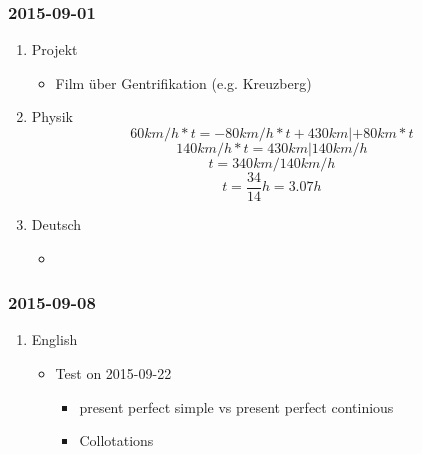 \documentclass[11pt]{article}
\begin{document}
\subsubsection{2015-09-01}
\label{sec-1-2-3}
\begin{enumerate}
\item Projekt
\label{sec-1-2-3-1}
\begin{itemize}
\item Film über Gentrifikation (e.g. Kreuzberg)
\end{itemize}
\item Physik
\label{sec-1-2-3-2}
\begin{equation}
60km/h * t = -80km/h * t + 430km | + 80km * t
\end{equation}
\begin{equation}
140km/h * t = 430km | 140km/h
\end{equation}
\begin{equation}
t = 340km/140km/h
\end{equation}
\begin{equation}
t = \frac{34}{14}h = 3.07h
\end{equation}
\item Deutsch
\label{sec-1-2-3-3}
\begin{itemize}
\item 
\end{itemize}
\end{enumerate}
\subsubsection{2015-09-08}
\label{sec-1-2-4}
\begin{enumerate}
\item English
\label{sec-1-2-4-1}
\begin{itemize}
\item Test on 2015-09-22
\begin{itemize}
\item present perfect simple vs present perfect continious
\item Collotations
\end{itemize}
\end{itemize}
\end{enumerate}
\end{document}
